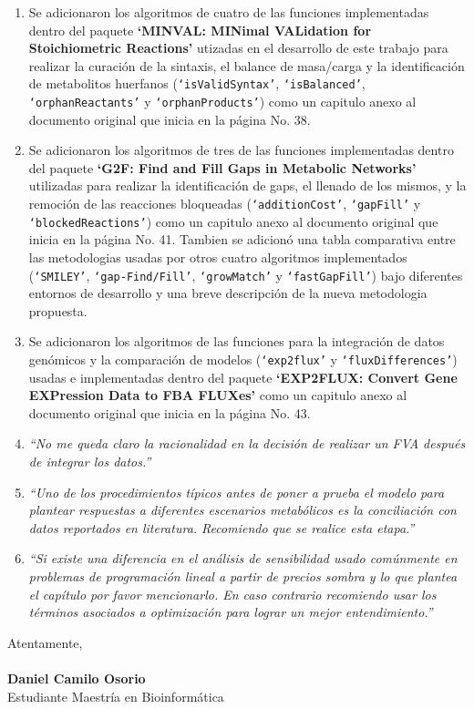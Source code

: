 \documentclass[11pt,a4paper]{article}
\begin{document}
\begin{enumerate}
\item Se adicionaron los algoritmos de cuatro de las  funciones implementadas dentro del paquete \textbf{`MINVAL: MINimal VALidation for Stoichiometric Reactions'} utizadas en el desarrollo de este trabajo para realizar la curación de la sintaxis, el balance de masa/carga y  la identificación de metabolitos huerfanos (\texttt{`isValidSyntax'}, \texttt{`isBalanced'}, \texttt{`orphanReactants'} y \texttt{`orphanProducts'}) como un capitulo anexo al documento original que inicia en la página No. 38.

\item Se adicionaron los algoritmos de tres de las funciones implementadas dentro del paquete \textbf{`G2F: Find and Fill Gaps in Metabolic Networks'} utilizadas para realizar la identificación de gaps, el llenado de los mismos, y la remoción de las reacciones bloqueadas (\texttt{`additionCost'}, \texttt{`gapFill'} y \texttt{`blockedReactions'}) como un capitulo anexo al documento original que inicia en la página No. 41. Tambien se adicionó una tabla comparativa entre las metodologias usadas por otros cuatro algoritmos implementados (\texttt{`SMILEY'}, \texttt{`gap-Find/Fill'}, \texttt{`growMatch'} y \texttt{`fastGapFill'}) bajo diferentes entornos de desarrollo y una breve descripción de la nueva metodologia propuesta.

\item Se adicionaron los algoritmos de las funciones para la integración de datos genómicos y la comparación de modelos  (\texttt{`exp2flux'} y \texttt{`fluxDifferences'}) usadas e implementadas dentro del paquete \textbf{`EXP2FLUX: Convert Gene EXPression Data to FBA FLUXes'} como un capitulo anexo al documento original que inicia en la página No. 43.

\item \emph{``No me queda claro la racionalidad en la decisión de realizar un FVA después de integrar los datos.''}

\item \emph{``Uno de los procedimientos típicos antes de poner a prueba el modelo para plantear respuestas a diferentes escenarios metabólicos es la conciliación con datos reportados en literatura. Recomiendo que se realice esta etapa.''}

\item \emph{``Si existe una diferencia en el análisis de sensibilidad usado comúnmente en problemas de programación lineal a partir de precios sombra y lo que plantea el capítulo por favor mencionarlo. En caso contrario recomiendo usar los términos asociados a optimización para lograr un mejor entendimiento.''}

\end{enumerate}
Atentamente,\\
\\
\textbf{Daniel Camilo Osorio}\\
Estudiante Maestría en Bioinformática
\end{document}
